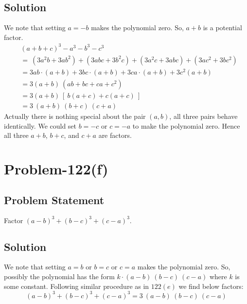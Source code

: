 \documentclass[12pt]{article}
\begin{document}
\subsection*{Solution}
We note that setting $a=-b$ makes the polynomial zero. So, $a+b$ is a potential factor.
\begin{equation*}
	\begin{aligned}
		& (a+b+c)^3 -a^3-b^3-c^3\\
		&=\ \left( 3a^2b+3ab^2 \right) + \left( 3abc+3b^2c \right) + \left( 3a^2c+3abc \right) + \left( 3ac^2 + 3bc^2 \right)\\
		&= 3ab\cdot (a+b) + 3bc\cdot (a+b) + 3ca\cdot (a+b) + 3c^2(a+b)\\
		&= 3(a+b)\ \left(ab+bc+ca+c^2\right)\\
		&= 3(a+b)\ [\ b(a+c)+c(a+c)\ ]\\
		&= 3\ (a+b)\ (b+c)\ (c+a)
	\end{aligned}
\end{equation*}
Actually there is nothing special about the pair $(a,b)$, all three pairs behave identically. We could set $b=-c$ or $c=-a$ to make the polynomial zero. Hence all three $a+b$, $b+c$, and $c+a$ are factors.

\section*{Problem-122(f)}
\subsection*{Problem Statement}
Factor $(a-b)^3 + (b-c)^3 + (c-a)^3$.
\subsection*{Solution}
We note that setting $a=b$ or $b=c$ or $c=a$ makes the polynomial zero. So, possibly the polynomial has the form $k\cdot (a-b)\ (b-c)\ (c-a)$ where $k$ is some constant. Following similar procedure as in $122(e)$ we find below factors:
\[
	(a-b)^3 + (b-c)^3 + (c-a)^3 = 3\ (a-b)\ (b-c)\ (c-a)
\]
\end{document}
